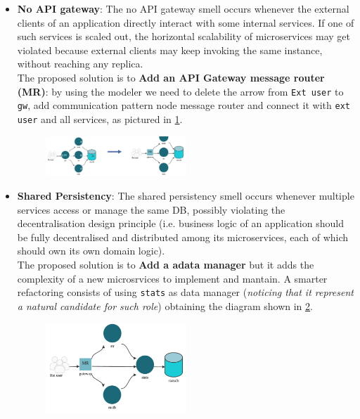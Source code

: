 \documentclass[10pt,a4paper]{report}
\begin{document}
\begin{itemize}
	\item \textbf{No API gateway}: The no API gateway smell occurs whenever the external clients of an application directly
	interact with some internal services. If one of such services is scaled out, the horizontal
	scalability of microservices may get violated because external clients may keep invoking the
	same instance, without reaching any replica.\\
	The proposed solution is to \textbf{Add an API Gateway message router (MR)}: by using the modeler we need to delete the arrow from \texttt{Ext user} to \texttt{gw}, add communication pattern node message router and connect it with \texttt{ext user} and all services, as pictured in \ref{microfresh-refact-1}. 
	\begin{figure}[h]
		\centering
		\includegraphics[width=0.5\textwidth]{image-microf-ref1}
		\caption{}
		\label{microfresh-refact-1}
	\end{figure}

	\item \textbf{Shared Persistency}: The shared persistency smell occurs whenever multiple services access or manage the same
	DB, possibly violating the decentralisation design principle (i.e. business logic of an
	application should be fully decentralised and distributed among its microservices, each of
	which should own its own domain logic).\\ The proposed solution is to \textbf{Add a adata manager} but it adds the complexity of a new microsrvices to implement and mantain. A smarter refactoring consists of using \texttt{stats} as data manager (\textit{noticing that it represent a natural candidate for such role}) obtaining the diagram shown in \ref{microfresh-refact-2}.
		\begin{figure}[h]
		\centering
		\includegraphics[width=0.5\textwidth]{image-microf-ref2}
		\caption{}
		\label{microfresh-refact-2}
	\end{figure}


\end{itemize}
\end{document}
